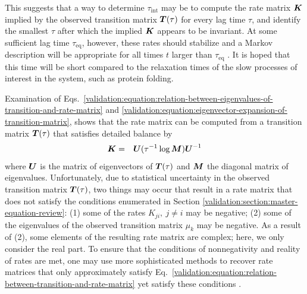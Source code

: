 
This suggests that a way to determine $\tau_{\mathrm{int}}$ may be to compute the rate matrix ${\mbox{\boldmath{$K$}}}$ implied by the observed transition matrix ${\mbox{\boldmath{$T$}}}(\tau)$ for every lag time $\tau$, and identify the smallest $\tau$ after which the implied ${\mbox{\boldmath{$K$}}}$ appears to be invariant.
At some sufficient lag time $\tau_\mathrm{eq}$, however, these rates should stabilize and a Markov description will be appropriate for all times $t$ larger than $\tau_\mathrm{eq}$ \cite{swope:2004a}.  
It is hoped that this time will be short compared to the relaxation times of the slow processes of interest in the system, such as protein folding.  

Examination of Eqs.\ \ref{validation:equation:relation-between-eigenvalues-of-transition-and-rate-matrix} and \ref{validation:equation:eigenvector-expansion-of-transition-matrix}, shows that the rate matrix can be computed from a transition matrix ${\mbox{\boldmath{$T$}}}(\tau)$ that satisfies detailed balance by
\begin{eqnarray}
{\mbox{\boldmath{$K$}}} &=& {\mbox{\boldmath{$U$}}} (\tau^{-1} \log {\mbox{\boldmath{$M$}}}) {\mbox{\boldmath{$U$}}}^{-1} \label{validation:equation:implied-rate-matrix}
\end{eqnarray}
where ${\mbox{\boldmath{$U$}}}$ is the matrix of eigenvectors of ${\mbox{\boldmath{$T$}}}(\tau)$ and ${\mbox{\boldmath{$M$}}}$ the diagonal matrix of eigenvalues.
Unfortunately, due to statistical uncertainty in the observed transition matrix ${\mbox{\boldmath{$T$}}}(\tau)$, two things may occur that result in a rate matrix that does not satisfy the conditions enumerated in Section \ref{validation:section:master-equation-review}:
(1) some of the rates $K_{ji}, \: j \ne i$ may be negative;
(2) some of the eigenvalues of the observed transition matrix $\mu_k$ may be negative.
As a result of (2), some elements of the resulting rate matrix are complex; here, we only consider the real part.
To ensure that the conditions of nonnegativity and reality of rates are met, one may use more sophisticated methods to recover rate matrices that only approximately satisfy Eq.\ \ref{validation:equation:relation-between-transition-and-rate-matrix} yet satisfy these conditions \cite{grubmueller:1994a,sriraman:2005a}.

